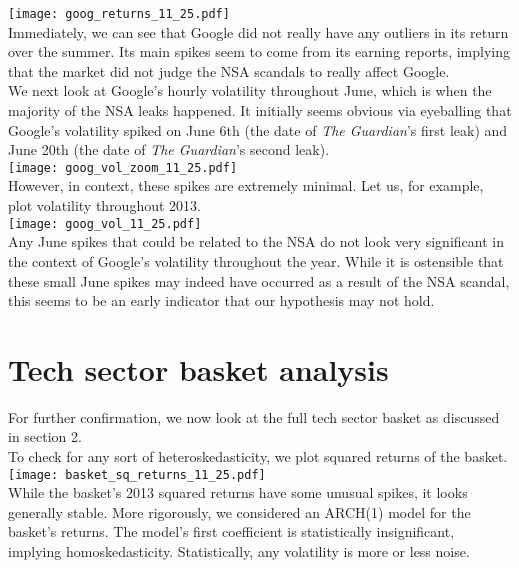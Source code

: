 \documentclass[11pt]{amsart}
\begin{document}
\texttt{[image: goog\_returns\_11\_25.pdf]} \\

Immediately, we can see that Google did not really have any outliers in its return over the summer. Its main spikes seem to come from its earning reports, implying that the market did not judge the NSA scandals to really affect Google. \\

We next look at Google's hourly volatility throughout June, which is when the majority of the NSA leaks happened. It initially seems obvious via eyeballing that Google's volatility spiked on June 6th (the date of \textit{The Guardian}'s first leak) and June 20th (the date of \textit{The Guardian}'s second leak). \\

\texttt{[image: goog\_vol\_zoom\_11\_25.pdf]} \\

However, in context, these spikes are extremely minimal. Let us, for example, plot volatility throughout 2013. \\

\texttt{[image: goog\_vol\_11\_25.pdf]} \\

Any June spikes that could be related to the NSA do not look very significant in the context of Google's volatility throughout the year. While it is ostensible that these small June spikes may indeed have occurred as a result of the NSA scandal, this seems to be an early indicator that our hypothesis may not hold.

\newpage
\section{Tech sector basket analysis}
For further confirmation, we now look at the full tech sector basket as discussed in section 2. \\

To check for any sort of heteroskedasticity, we plot squared returns of the basket. \\

\texttt{[image: basket\_sq\_returns\_11\_25.pdf]} \\

\newpage
While the basket's 2013 squared returns have some unusual spikes,  it looks generally stable. More rigorously, we considered an ARCH(1) model for the basket's returns. The model's first coefficient is statistically insignificant, implying homoskedasticity. Statistically, any volatility is more or less noise. \\
\end{document}
